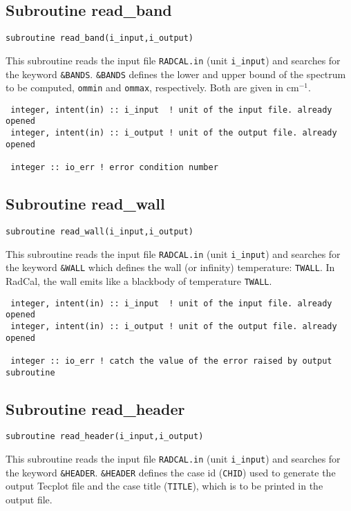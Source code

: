 \subsection{Subroutine read\_band}
\label{sub:read_band}
\begin{lstlisting}
subroutine read_band(i_input,i_output)
\end{lstlisting}
This subroutine reads the input file \verb=RADCAL.in= (unit \verb=i_input=) and searches for the keyword \verb=&BANDS=. \verb=&BANDS= defines the lower and upper bound of the spectrum to be computed, \verb=ommin= and \verb=ommax=, respectively. Both are given in cm$^{-1}$.

\begin{lstlisting}
 integer, intent(in) :: i_input  ! unit of the input file. already opened
 integer, intent(in) :: i_output ! unit of the output file. already opened

 integer :: io_err ! error condition number
\end{lstlisting}


\subsection{Subroutine read\_wall}
\label{sub:read_wall}
\begin{lstlisting}
subroutine read_wall(i_input,i_output)
\end{lstlisting}
 This subroutine reads the input file \verb=RADCAL.in= (unit \verb=i_input=) and searches for the keyword \verb=&WALL= which defines the wall (or infinity) temperature: \verb=TWALL=. In RadCal, the wall emits like a blackbody of temperature \verb=TWALL=.

\begin{lstlisting}
 integer, intent(in) :: i_input  ! unit of the input file. already opened
 integer, intent(in) :: i_output ! unit of the output file. already opened

 integer :: io_err ! catch the value of the error raised by output subroutine
\end{lstlisting}


\subsection{Subroutine read\_header}
\label{sub:read_header}

\begin{lstlisting}
subroutine read_header(i_input,i_output)
\end{lstlisting}
This subroutine reads the input file \verb=RADCAL.in= (unit \verb=i_input=) and searches for the keyword \verb=&HEADER=. \verb=&HEADER= defines the case id (\verb=CHID=) used to generate the output Tecplot file and the case title (\verb=TITLE=), which is to be printed in the output file.

